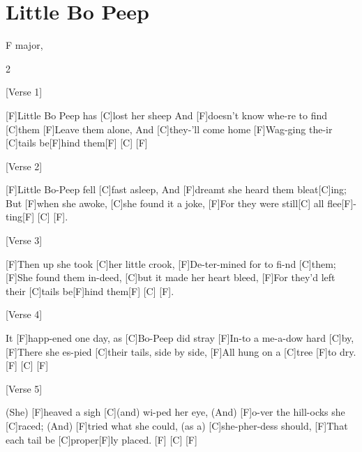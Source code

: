 \documentclass[../../../BabySongs]{subfiles}
\begin{document}
\section{Little Bo Peep}

{\tiny%
    F major, %
}

\begin{guitar}
    \begin{multicols}{2}

    [Verse 1]

    [F]Little Bo Peep has [C]lost her sheep
    And [F]doesn't know whe-re to find [C]them
    [F]Leave them alone, And [C]they-'ll come home
    [F]Wag-ging the-ir [C]tails be[F]hind them[F] [C] [F]
    
    [Verse 2]

    [F]Little Bo-Peep fell [C]fast asleep,
    And [F]dreamt she heard them bleat[C]ing;
    But [F]when she awoke, [C]she found it a joke,
    [F]For they were still[C] all flee[F]-ting[F] [C] [F].

    [Verse 3]
    
    [F]Then up she took [C]her little crook,
    [F]De-ter-mined for to fi-nd [C]them;
    [F]She found them in-deed, [C]but it made her heart bleed,
    [F]For they'd left their [C]tails be[F]hind them[F] [C] [F].

    [Verse 4]

    It [F]happ-ened one day, as [C]Bo-Peep did stray
    [F]In-to a me-a-dow hard [C]by,
    [F]There she es-pied [C]their tails, side by side,
    [F]All hung on a [C]tree [F]to dry.[F] [C] [F]

    [Verse 5]

    (She) [F]heaved a sigh [C](and) wi-ped her eye,
    (And) [F]o-ver the hill-ocks she [C]raced;
    (And) [F]tried what she could, (as a) [C]she-pher-dess should,
    [F]That each tail be [C]proper[F]ly placed. [F] [C] [F]

    \end{multicols}
\end{guitar}
\end{document}
